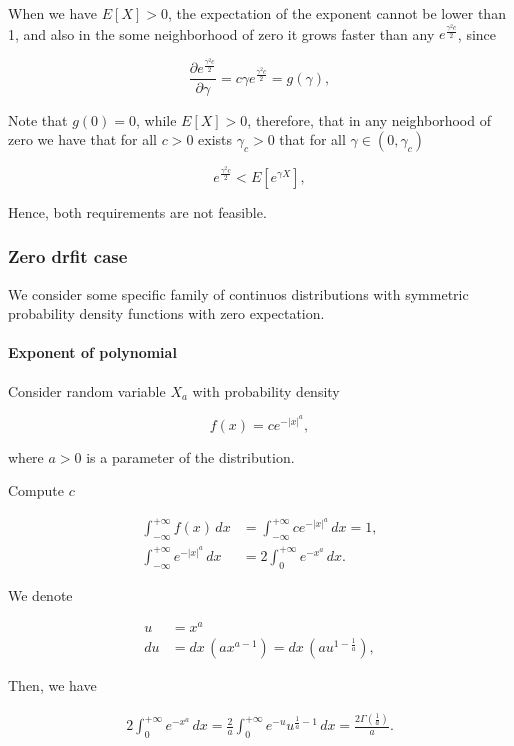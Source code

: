 \documentclass[12pt, a4paper]{article}
\theoremstyle{remark}
\newcommand{\expx}[1]{e^{-|x|^{#1}}}
\newcommand{\expxpoz}[1]{e^{-x^{#1}}}
\newcommand{\infint}[1]{\int_{-\infty}^{+\infty} #1 \, dx}
\newcommand{\infintpoz}[1]{\int_{0}^{+\infty} #1 \, dx}
\begin{document}
When we have \(E\left[X\right] > 0\), the expectation of the exponent cannot be lower than 1, and also in the some neighborhood of zero it grows faster than any $e^{\frac{\gamma^2 c}{2}}$, since

$$\frac{\partial e^{\frac{\gamma^2 c}{2}}}{\partial \gamma} = c\gamma e^{\frac{\gamma^2 c}{2}} = g(\gamma),$$

Note that $g(0) = 0$, while $E[X] > 0$, therefore, that in any neighborhood of zero we have that for all \(c>0\) exists \(\gamma_c > 0\)  that for all \(\gamma \in (0, \gamma_c)\) 

$$e^{\frac{\gamma^2 c}{2}} < E[e^{\gamma X}],$$


Hence, both requirements are not feasible.

\subsubsection{Zero drfit case}
\label{sec:zero}

We consider some specific family of continuos distributions with symmetric probability density functions with zero expectation.

\paragraph*{Exponent of polynomial}

\hfill

\hfill

Consider random variable \(X_a\) with probability density

$$f(x) = c \expx{a},$$

where \(a > 0\) is a parameter of the distribution.

Compute $c$

\begin{align*}
    \infint{f(x)} & = \infint{c\expx{a}} = 1, \\
    \infint{\expx{a}} & = 2\infintpoz{\expxpoz{a}}.
\end{align*}

We denote

\begin{align*}
    u  & = x^a                                              \\
    du & = dx\,(a x^{a - 1}) = dx\,(a u^{1 - \frac{1}{a}}),
\end{align*}

Then, we have

\begin{align*}
    2\infintpoz{\expxpoz{a}} = \frac{2}{a} \infintpoz{e^{-u}u^{\frac{1}{a} - 1}} = \frac{2\Gamma(\frac{1}{a})}{a}.
\end{align*}
\end{document}
